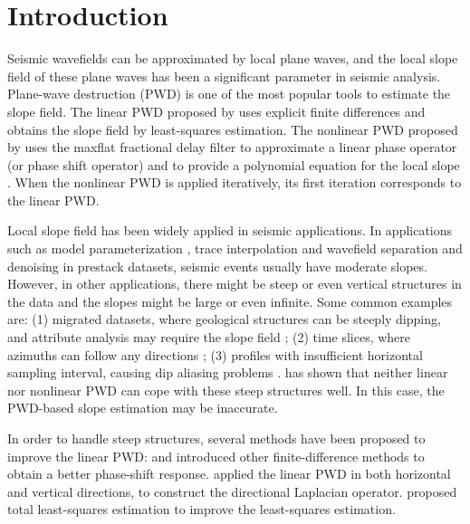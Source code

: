 \section{Introduction}

Seismic wavefields can be approximated by local plane waves,
and the local slope field of these plane waves
has been a significant parameter in seismic analysis.
Plane-wave destruction (PWD) is one of the most popular tools 
to estimate the slope field.
The linear PWD proposed by \cite{claerbout1992earth} 
uses explicit finite differences and
obtains the slope field by least-squares estimation.  
The nonlinear PWD proposed by \cite{fomel:1946} 
uses the maxflat fractional delay filter 
\cite[]{thiran1971recursive,zhang2009maxflat}
to approximate a linear phase operator (or phase shift operator)
and to provide a polynomial equation for the local slope \cite[]{chen:2012a}. 
When the nonlinear PWD is applied iteratively,
its first iteration corresponds to the linear PWD.



Local slope field
has been widely applied in seismic applications.
In applications such as 
model parameterization \cite[]{fomel:A43,fomel:U89},
trace interpolation \cite[]{bardan1987trace}
and wavefield separation and denoising \cite[]{harlan:1869}
in prestack datasets,
seismic events usually have moderate slopes.
However, in other applications,
there might be steep or even vertical structures in the data
and the slopes might be large or even infinite.
Some common examples are:
(1) migrated datasets, where
geological structures can be steeply dipping,
and attribute analysis may require the slope field
\cite[]{marfurt:104};
(2) time slices, where azimuths
can follow any directions
\cite[ Figure 2a is a good example]{marfurt:P29};
(3) profiles with insufficient horizontal sampling interval,
causing dip aliasing problems \cite[]{barnes:264}.
\cite{halelocal} has shown that neither linear nor nonlinear PWD 
can cope with these steep structures well.
In this case, the PWD-based slope estimation may be inaccurate.

In order to handle steep structures, 
several methods have 
been proposed to improve the linear PWD:
\cite{davis:2775} and \cite{Noye2000385} introduced other finite-difference 
methods to obtain a better phase-shift response.
\cite{halelocal} applied the linear PWD 
in both horizontal and vertical directions,
to construct the directional Laplacian operator.
\cite{schleicher:P25} proposed total least-squares estimation
to improve the least-squares estimation.

